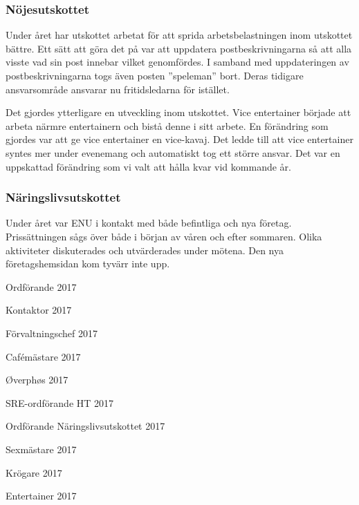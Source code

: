 \documentclass[../_main/handlingar.tex]{subfiles}
\begin{document}
\subsubsection*{Nöjesutskottet}
Under året har utskottet arbetat för att sprida arbetsbelastningen inom utskottet bättre. Ett sätt att göra det på var att uppdatera postbeskrivningarna så att alla visste vad sin post innebar vilket genomfördes. I samband med uppdateringen av postbeskrivningarna togs även posten ”speleman” bort. Deras tidigare ansvarsområde ansvarar nu fritidsledarna för istället.

Det gjordes ytterligare en utveckling inom utskottet. Vice entertainer började att arbeta närmre entertainern och bistå denne i sitt arbete. En förändring som gjordes var att ge vice entertainer en vice-kavaj. Det ledde till att vice entertainer syntes mer under evenemang och automatiskt tog ett större ansvar. Det var en uppskattad förändring som vi valt att hålla kvar vid kommande år.

\subsubsection*{Näringslivsutskottet}
Under året var ENU i kontakt med både befintliga och nya företag. Prissättningen sågs över både i början av våren och efter sommaren. Olika aktiviteter diskuterades och utvärderades under mötena. Den nya företagshemsidan kom tyvärr inte upp.

\newpage
\begin{signatures}{10}
    \mvh
    \signature{Erik Månsson}{Ordförande 2017}
    \signature{Johan Karlberg}{Kontaktor 2017}
    \signature{Sophia Grimmeiss Grahm}{Förvaltningschef 2017}
    \signature{Daniel Bakic}{Cafémästare 2017}
    \signature{Niklas Gustafson}{Øverphøs 2017}
    \signature{Edvard Carlsson}{SRE-ordförande HT 2017}
    \signature{Josefine Sandström}{Ordförande Näringslivsutskottet 2017}
    \signature{Linnea Sjödahl}{Sexmästare 2017}
    \signature{Markus Rahne}{Krögare 2017}
    \signature{Albin Nyström Eklund}{Entertainer 2017}
\end{signatures}
\end{document}
